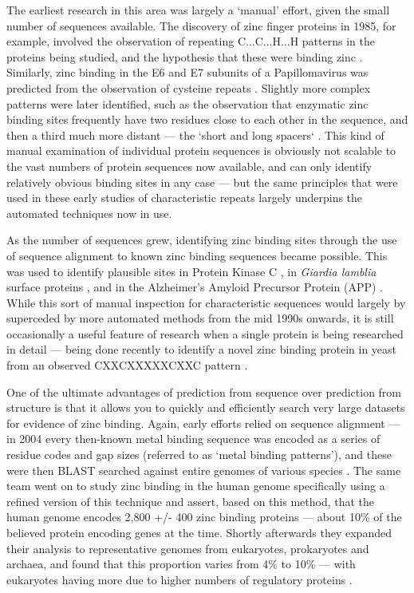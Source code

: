 The earliest research in this area was largely a `manual' effort, given the small number of sequences available. The discovery of zinc finger proteins in 1985, for example, involved the observation of repeating C...C...H...H patterns in the proteins being studied, and the hypothesis that these were binding zinc \cite{miller1985repetitive}. Similarly, zinc binding in the E6 and E7 subunits of a Papillomavirus was predicted from the observation of cysteine repeats \cite{barbosa1989papillomavirus}. Slightly more complex patterns were later identified, such as the observation that enzymatic zinc binding sites frequently have two residues close to each other in the sequence, and then a third much more distant --- the `short and long spacers` \cite{vallee1989short}. This kind of manual examination of individual protein sequences is obviously not scalable to the vast numbers of protein sequences now available, and can only identify relatively obvious binding sites in any case --- but the same principles that were used in these early studies of characteristic repeats largely underpins the automated techniques now in use.

As the number of sequences grew, identifying zinc binding sites through the use of sequence alignment to known zinc binding sequences became possible. This was used to identify plausible sites in Protein Kinase C \cite{bishop1991identification}, in {\it Giardia lamblia} surface proteins \cite{nash1993variant}, and in the Alzheimer's Amyloid Precursor Protein (APP) \cite{bush1993novel}. While this sort of manual inspection for characteristic sequences would largely by superceded by more automated methods from the mid 1990s onwards, it is still occasionally a useful feature of research when a single protein is being researched in detail --- being done recently to identify a novel zinc binding protein in yeast from an observed CXXCXXXXXCXXC pattern \cite{furukawa2018identification}.

One of the ultimate advantages of prediction from sequence over prediction from structure is that it allows you to quickly and efficiently search very large datasets for evidence of zinc binding. Again, early efforts relied on sequence alignment --- in 2004 every then-known metal binding sequence was encoded as a series of residue codes and gap sizes (referred to as `metal binding patterns'), and these were then BLAST searched against entire genomes of various species \cite{andreini2004hint}. The same team went on to study zinc binding in the human genome specifically using a refined version of this technique and assert, based on this method, that the human genome encodes 2,800 +/- 400 zinc binding proteins --- about 10\% of the believed protein encoding genes at the time\cite{andreini2006counting}. Shortly afterwards they expanded their analysis to representative genomes from eukaryotes, prokaryotes and archaea, and found that this proportion varies from 4\% to 10\% --- with eukaryotes having more due to higher numbers of regulatory proteins \cite{passerini2007predicting}.

